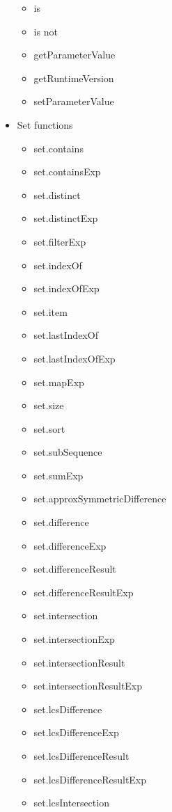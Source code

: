 \begin{itemize}
\begin{itemize}
        \item is
        \item is not
        \item getParameterValue
        \item getRuntimeVersion
        \item setParameterValue
    \end{itemize}

    \item Set functions
    \begin{itemize}
        \item set.contains
        \item set.containsExp
        \item set.distinct
        \item set.distinctExp
        \item set.filterExp
        \item set.indexOf
        \item set.indexOfExp
        \item set.item
        \item set.lastIndexOf
        \item set.lastIndexOfExp
        \item set.mapExp
        \item set.size
        \item set.sort
        \item set.subSequence
        \item set.sumExp
        \item set.approxSymmetricDifference
        \item set.difference
        \item set.differenceExp
        \item set.differenceResult
        \item set.differenceResultExp
        \item set.intersection
        \item set.intersectionExp
        \item set.intersectionResult
        \item set.intersectionResultExp
        \item set.lcsDifference
        \item set.lcsDifferenceExp
        \item set.lcsDifferenceResult
        \item set.lcsDifferenceResultExp
        \item set.lcsIntersection

\end{itemize}
\end{itemize}
